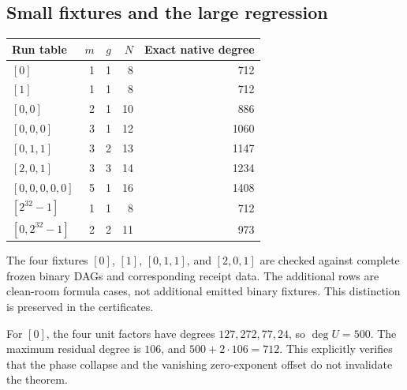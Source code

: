 \documentclass[11pt,letterpaper]{article}
\theoremstyle{definition}\newtheorem{definition}[theorem]{Definition}
\theoremstyle{remark}\newtheorem{remark}[theorem]{Remark}
\begin{document}
\subsection{Small fixtures and the large regression}
\begin{center}
\begin{tabular}{lrrrr}
\toprule
Run table & $m$ & $g$ & $N$ & Exact native degree\\\midrule
$[0]$ & 1 & 1 & 8 & 712\\
$[1]$ & 1 & 1 & 8 & 712\\
$[0,0]$ & 2 & 1 & 10 & 886\\
$[0,0,0]$ & 3 & 1 & 12 & 1060\\
$[0,1,1]$ & 3 & 2 & 13 & 1147\\
$[2,0,1]$ & 3 & 3 & 14 & 1234\\
$[0,0,0,0,0]$ & 5 & 1 & 16 & 1408\\
$[2^{32}-1]$ & 1 & 1 & 8 & 712\\
$[0,2^{32}-1]$ & 2 & 2 & 11 & 973\\\bottomrule
\end{tabular}
\end{center}
The four fixtures $[0]$, $[1]$, $[0,1,1]$, and $[2,0,1]$ are checked against complete frozen binary DAGs and corresponding receipt data. The additional rows are clean-room formula cases, not additional emitted binary fixtures. This distinction is preserved in the certificates.

For $[0]$, the four unit factors have degrees $127,272,77,24$, so $\deg U=500$. The maximum residual degree is $106$, and $500+2\cdot106=712$. This explicitly verifies that the phase collapse and the vanishing zero-exponent offset do not invalidate the theorem.
\end{document}
